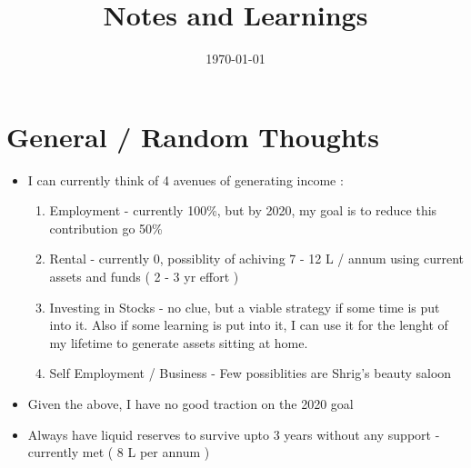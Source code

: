 \documentclass[a4paper]{article}
\begin{document}
\large

\title{Notes and Learnings}
\date{\today}
\maketitle

\tableofcontents
\listoffigures
\pagebreak

\section{General / Random Thoughts}
\begin{itemize}
  \item I can currently think of 4 avenues of generating income :
    \begin{enumerate}
      \item Employment - currently 100\%, but by 2020, my goal is to reduce this contribution go 50\%
      \item Rental - currently 0, possiblity of achiving 7 - 12 L / annum using current assets and funds ( 2 - 3 yr effort )
      \item Investing in Stocks - no clue, but a viable strategy if some time is put into it. Also if some learning is put into it, I can use it for the lenght of my lifetime to generate assets sitting at home.
      \item Self Employment / Business - Few possiblities are Shrig's beauty saloon
    \end{enumerate}
  \item Given the above, I have no good traction on the 2020 goal
  \item Always have liquid reserves to survive upto 3 years without any support - currently met ( 8 L per annum )
\end{itemize}
\end{document}
